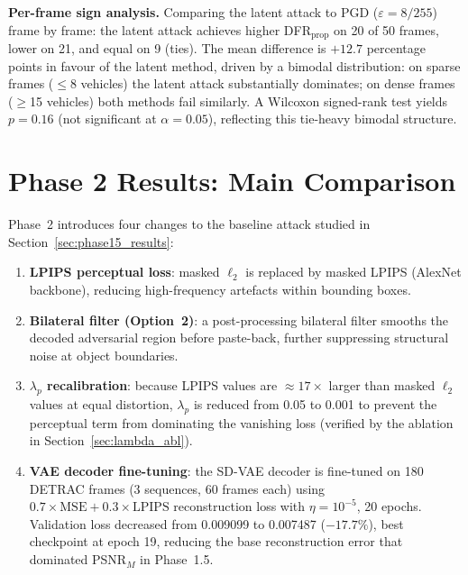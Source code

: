 \documentclass[12pt,a4paper]{report}
\begin{document}
\textbf{Per-frame sign analysis.}
Comparing the latent attack to PGD ($\varepsilon{=}8/255$) frame by frame:
the latent attack achieves higher DFR$_{\text{prop}}$ on 20 of 50 frames,
lower on 21, and equal on 9 (ties). The mean difference is $+12.7$
percentage points in favour of the latent method, driven by a bimodal
distribution: on sparse frames ($\leq$8 vehicles) the latent attack
substantially dominates; on dense frames ($\geq$15 vehicles) both methods
fail similarly. A Wilcoxon signed-rank test yields $p = 0.16$ (not
significant at $\alpha=0.05$), reflecting this tie-heavy bimodal structure.



\section{Phase 2 Results: Main Comparison}
\label{sec:phase2_results}

Phase~2 introduces four changes to the baseline attack studied in Section~\ref{sec:phase15_results}:

\begin{enumerate}[itemsep=2pt]
  \item \textbf{LPIPS perceptual loss}: masked $\ell_2$ is replaced by masked LPIPS
        (AlexNet backbone), reducing high-frequency artefacts within bounding boxes.
  \item \textbf{Bilateral filter (Option~2)}: a post-processing bilateral filter
        smooths the decoded adversarial region before paste-back, further suppressing
        structural noise at object boundaries.
  \item \textbf{$\lambda_p$ recalibration}: because LPIPS values are $\approx17\times$
        larger than masked $\ell_2$ values at equal distortion, $\lambda_p$ is reduced
        from 0.05 to 0.001 to prevent the perceptual term from dominating the vanishing
        loss (verified by the ablation in Section~\ref{sec:lambda_abl}).
  \item \textbf{VAE decoder fine-tuning}: the SD-VAE decoder is fine-tuned on 180
        DETRAC frames (3 sequences, 60 frames each) using $0.7{\times}\text{MSE} +
        0.3{\times}\text{LPIPS}$ reconstruction loss with $\eta{=}10^{-5}$, 20 epochs.
        Validation loss decreased from 0.009099 to 0.007487 ($-17.7\%$), best checkpoint
        at epoch 19, reducing the base reconstruction error that dominated PSNR$_M$ in
        Phase~1.5.
\end{enumerate}
\end{document}
